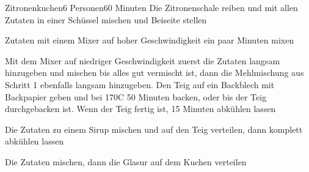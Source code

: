 
\begin{recipe}{Zitronenkuchen}{6 Personen}{60 Minuten}
Die Zitronenschale reiben und mit allen Zutaten in einer Schüssel mischen und Beiseite stellen

Zutaten mit einem Mixer auf hoher Geschwindigkeit ein paar Minuten mixen

Mit dem Mixer auf niedriger Geschwindigkeit zuerst die Zutaten langsam hinzugeben und mischen bis alles gut vermischt ist, dann die Mehlmischung aus Schritt 1 ebenfalls langsam hinzugeben. Den Teig auf ein Backblech mit Backpapier geben und bei 170\0C 50 Minuten backen, oder bis der Teig durchgebacken ist. Wenn der Teig fertig ist, 15 Minuten abkühlen lassen

Die Zutaten zu einem Sirup mischen und auf den Teig verteilen, dann komplett abkühlen lassen

Die Zutaten mischen, dann die Glasur auf dem Kuchen verteilen
\end{recipe}

